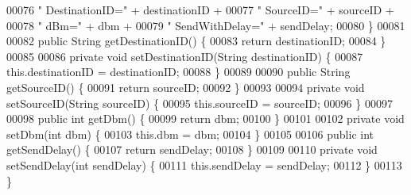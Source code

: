 \begin{DoxyCode}
00076                 \textcolor{stringliteral}{" DestinationID="} + destinationID +
00077                 \textcolor{stringliteral}{" SourceID="} + sourceID +
00078                 \textcolor{stringliteral}{" dBm="} + dbm +
00079                 \textcolor{stringliteral}{" SendWithDelay="} + sendDelay;
00080     \}
00081 
00082     \textcolor{keyword}{public} String getDestinationID() \{
00083         \textcolor{keywordflow}{return} destinationID;
00084     \}
00085 
00086     \textcolor{keyword}{private} \textcolor{keywordtype}{void} setDestinationID(String destinationID) \{
00087         this.destinationID = destinationID;
00088     \}
00089 
00090     \textcolor{keyword}{public} String getSourceID() \{
00091         \textcolor{keywordflow}{return} sourceID;
00092     \}
00093 
00094     \textcolor{keyword}{private} \textcolor{keywordtype}{void} setSourceID(String sourceID) \{
00095         this.sourceID = sourceID;
00096     \}
00097 
00098     \textcolor{keyword}{public} \textcolor{keywordtype}{int} getDbm() \{
00099         \textcolor{keywordflow}{return} dbm;
00100     \}
00101 
00102     \textcolor{keyword}{private} \textcolor{keywordtype}{void} setDbm(\textcolor{keywordtype}{int} dbm) \{
00103         this.dbm = dbm;
00104     \}
00105 
00106     \textcolor{keyword}{public} \textcolor{keywordtype}{int} getSendDelay() \{
00107         \textcolor{keywordflow}{return} sendDelay;
00108     \}
00109 
00110     \textcolor{keyword}{private} \textcolor{keywordtype}{void} setSendDelay(\textcolor{keywordtype}{int} sendDelay) \{
00111         this.sendDelay = sendDelay;
00112     \}
00113 \}
\end{DoxyCode}
